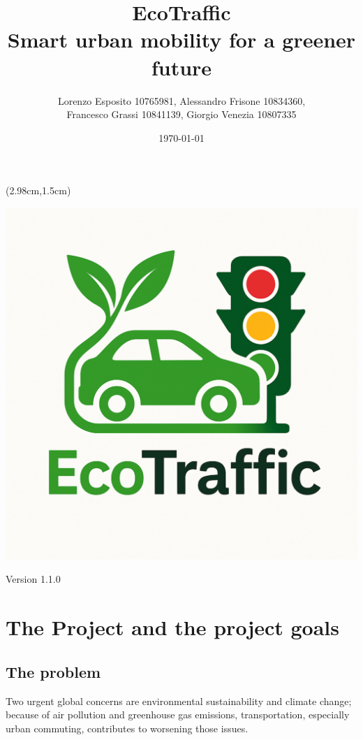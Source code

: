 \documentclass[12pt, a4paper, twoside, openright]{report}
\title{\textbf{EcoTraffic}\\Smart urban mobility for a greener future}
\author{Lorenzo Esposito 10765981, Alessandro Frisone 10834360, \\ Francesco Grassi 10841139, Giorgio Venezia 10807335}
\date{\today}
\begin{document}
\begin{textblock*}{\textwidth}(2.98cm,1.5cm)
  \begin{center}
    \includegraphics[scale=0.25]{images/EcoTraffic_logo.pdf}  
    \maketitle
    Version 1.1.0
  \end{center}  
\end{textblock*}


\blankpage

\tableofcontents
\afterpage{\blankpage}
\newpage
{}

\chapter{The Project and the project goals}
\section{The problem}
Two urgent global concerns are environmental sustainability and climate
change; because of air pollution and greenhouse gas emissions,
transportation, especially urban commuting, contributes to worsening
those issues.
\end{document}
